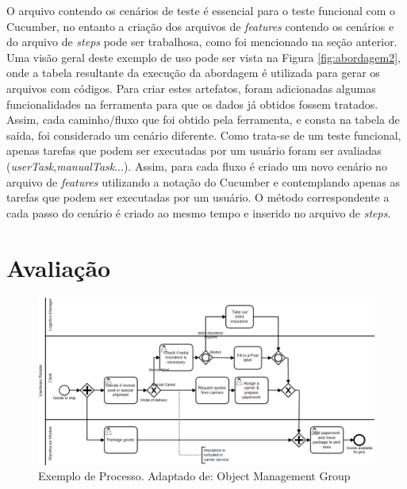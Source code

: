 \documentclass[12pt]{article}
\begin{document}
O arquivo contendo os cenários de teste é essencial para o teste funcional com o Cucumber, no entanto a criação dos arquivos de \emph{features} contendo os cenários e do arquivo de \emph{steps} pode ser trabalhosa, como foi mencionado na seção anterior. Uma visão geral deste exemplo de uso pode ser vista na Figura \ref{fig:abordagem2}, onde a tabela resultante da execução da abordagem é utilizada para gerar os arquivos com códigos. Para criar estes artefatos, foram adicionadas algumas funcionalidades na ferramenta para que os dados já obtidos fossem tratados. Assim, cada caminho/fluxo que foi obtido pela ferramenta, e consta na tabela de saída, foi considerado um cenário diferente. Como trata-se de um teste funcional, apenas tarefas que podem ser executadas por um usuário foram ser avaliadas (\emph{userTask},\emph{manualTask}...). Assim, para cada fluxo é criado um novo cenário no arquivo de \emph{features} utilizando a notação do Cucumber e contemplando apenas as tarefas que podem ser executadas por um usuário. O método correspondente a cada passo do cenário é criado ao mesmo tempo e inserido no arquivo de \emph{steps}. %


\section{Avaliação}
\begin{figure}[ht]
\includegraphics[width=.9\textwidth]{figuras/diagrama_exemplo.png}
\caption{Exemplo de Processo. Adaptado de: Object Management Group}
\label{fig:diagrama_exemplo}
\end{figure}
\end{document}
